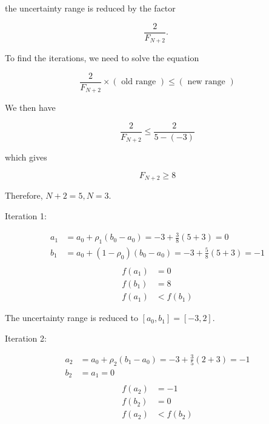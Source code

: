 the uncertainty range is reduced by the factor

\begin{equation*}
	\frac{2}{F_{N+2}} \text {. }
\end{equation*}

To find the iterations, we need to solve the equation

\begin{equation*}
	\frac{2}{F_{N+2}} \times(\text { old range }) \leq(\text { new range })
\end{equation*}

We then have

\begin{equation*}
	\frac{2}{F_{N+2}} \leq \frac{2}{5-(-3)}
\end{equation*}

which gives

\begin{equation*}
	F_{N+2} \geq 8
\end{equation*}

Therefore, \(N+2=5, N=3\).

Iteration 1:

\[
	\begin{aligned}
		a_{1}&=a_{0}+\rho_{1}\left(b_{0}-a_{0}\right)=-3+\frac{3}{8}(5+3)=0 \\
		b_{1}&=a_{0}+\left(1-\rho_{0}\right)\left(b_{0}-a_{0}\right)=-3+\frac{5}{8}(5+3)=-1 \\
	\end{aligned}
\]
\[
	\begin{aligned}
		f\left(a_{1}\right) &=0 \\
		f\left(b_{1}\right) &=8 \\
		f\left(a_{1}\right)&<f\left(b_{1}\right)
	\end{aligned}
\]

The uncertainty range is reduced to \(\left[a_{0}, b_{1}\right]=[-3,2]\).

Iteration 2:

\[
\begin{aligned}
	a_{2}&=a_{0}+\rho_{2}\left(b_{1}-a_{0}\right)=-3+\frac{3}{5}(2+3)=-1 \\
	b_{2}&=a_{1}=0 \\
\end{aligned}
\]
\[
\begin{aligned}
	f\left(a_{2}\right)&=-1 \\
	f\left(b_{2}\right)&=0 \\
	f\left(a_{2}\right)&<f\left(b_{2}\right)
\end{aligned}
\]


